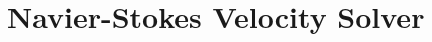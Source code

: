 \documentclass[11pt,letterpaper]{article}
\begin{document}
\renewcommand\thesection{\arabic{section}.}
\renewcommand\thesubsection{(\arabic{section}.\alph{subsection})}

\thispagestyle{fancyplain}
\section{Navier-Stokes Velocity Solver}


\newpage


\end{document}
